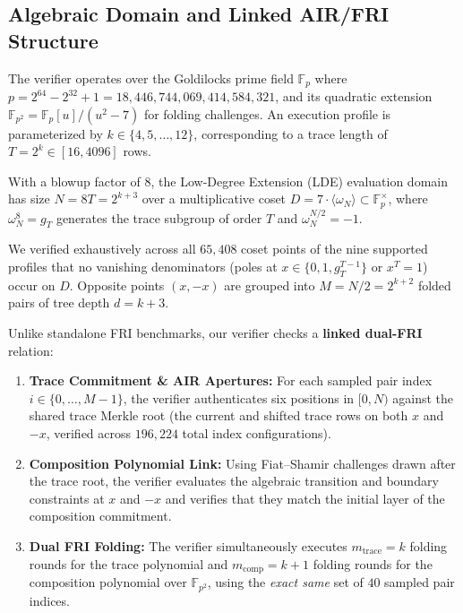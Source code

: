 \documentclass[conference]{IEEEtran}
\theoremstyle{definition}
\begin{document}
\subsection{Algebraic Domain and Linked AIR/FRI Structure}
The verifier operates over the Goldilocks prime field $\mathbb{F}_p$ where $p = 2^{64} - 2^{32} + 1 = 18{,}446{,}744{,}069{,}414{,}584{,}321$, and its quadratic extension $\mathbb{F}_{p^2} = \mathbb{F}_p[u]/(u^2 - 7)$ for folding challenges. An execution profile is parameterized by $k \in \{4, 5, \dots, 12\}$, corresponding to a trace length of $T = 2^k \in [16, 4096]$ rows.

With a blowup factor of $8$, the Low-Degree Extension (LDE) evaluation domain has size $N = 8T = 2^{k+3}$ over a multiplicative coset $D = 7 \cdot \langle \omega_N \rangle \subset \mathbb{F}_p^\times$, where $\omega_N^8 = g_T$ generates the trace subgroup of order $T$ and $\omega_N^{N/2} = -1$.

We verified exhaustively across all $65{,}408$ coset points of the nine supported profiles that no vanishing denominators (poles at $x \in \{0, 1, g_T^{T-1}\}$ or $x^T = 1$) occur on $D$. Opposite points $(x, -x)$ are grouped into $M = N / 2 = 2^{k+2}$ folded pairs of tree depth $d = k + 3$.

Unlike standalone FRI benchmarks, our verifier checks a \textbf{linked dual-FRI} relation:
\begin{enumerate}
    \setlength{\itemsep}{2pt}
    \item \textbf{Trace Commitment \& AIR Apertures:} For each sampled pair index $i \in \{0, \dots, M-1\}$, the verifier authenticates six positions in $[0, N)$ against the shared trace Merkle root (the current and shifted trace rows on both $x$ and $-x$, verified across $196{,}224$ total index configurations).
    \item \textbf{Composition Polynomial Link:} Using Fiat--Shamir challenges drawn after the trace root, the verifier evaluates the algebraic transition and boundary constraints at $x$ and $-x$ and verifies that they match the initial layer of the composition commitment.
    \item \textbf{Dual FRI Folding:} The verifier simultaneously executes $m_{\text{trace}} = k$ folding rounds for the trace polynomial and $m_{\text{comp}} = k + 1$ folding rounds for the composition polynomial over $\mathbb{F}_{p^2}$, using the \emph{exact same} set of $40$ sampled pair indices.
\end{enumerate}
\end{document}
